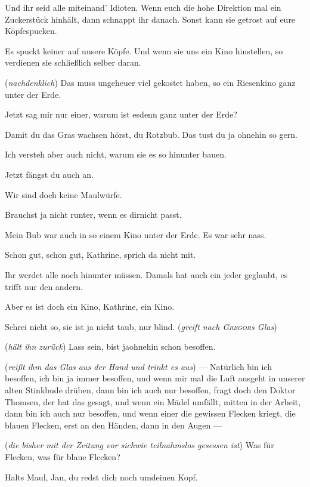 \documentclass[
	final,
	a4paper,
	ngerman,
	mpinclude = true, %
	twoside = true,
	open = right,
	cleardoublepage = plain,
	DIV = 13,
	BCOR = 1cm,
	titlepage = firstiscover,
	]{scrbook}
\newcommand{\direction}[1]{(\textit{#1})}
\newcommand{\thecharacter}[1]{\textup{\textsc{#1}}\xspace}
\newcommand{\theBarbara}{\thecharacter{Barbara}}
\newcommand{\theJosef}{\thecharacter{Josef}}
\newcommand{\theKathrine}{\thecharacter{Kathrine}}
\newcommand{\theGregor}{\thecharacter{Gregor}}
\newcommand{\theJan}{\thecharacter{Jan}}
\newcommand{\theAndreas}{\thecharacter{Andreas}}
\newcommand{\theLuise}{\thecharacter{Luise}}
\newcommand{\character}[1]{\item[#1]}
\newcommand{\Barbara}{\character{\theBarbara}}
\newcommand{\Josef}{\character{\theJosef}}
\newcommand{\Kathrine}{\character{\theKathrine}}
\newcommand{\Gregor}{\character{\theGregor}}
\newcommand{\Jan}{\character{\theJan}}
\newcommand{\Andreas}{\character{\theAndreas}}
\newcommand{\Luise}{\character{\theLuise}}
\begin{document}
\begin{play}
\Jan
Und ihr seid alle miteinand' Idioten. Wenn euch die hohe Direktion mal ein Zuckerstück hinhält, dann schnappt ihr danach. Sonst kann sie getrost auf eure Köpfespucken.

\Gregor
Es spuckt keiner auf unsere Köpfe. Und wenn sie uns ein Kino hinstellen, so verdienen sie schließlich selber daran.

\Luise
\direction{nachdenklich} Das muss ungeheuer viel gekostet haben, so ein Riesenkino ganz unter der Erde.

\Jan
Jetzt sag mir nur einer, warum ist esdenn ganz unter der Erde?

\Gregor
Damit du das Gras wachsen hörst, du Rotzbub. Das tust du ja ohnehin so gern.

\Andreas
Ich versteh aber auch nicht, warum sie es so hinunter bauen.

\Gregor
Jetzt fängst du auch an.

\Jan
Wir sind doch keine Maulwürfe.

\Gregor
Brauchst ja nicht runter, wenn es dirnicht passt.

\Kathrine
Mein Bub war auch in so einem Kino unter der Erde. Es war sehr nass.

\Josef
Schon gut, schon gut, Kathrine, sprich da nicht mit.

\Kathrine
Ihr werdet alle noch hinunter müssen. Damals hat auch ein jeder geglaubt, es trifft nur den andern.

\Josef
Aber es ist doch ein Kino, Kathrine, ein Kino.

\Jan
Schrei nicht so, sie ist ja nicht taub, nur blind. \direction{greift nach \theGregor{}s Glas}

\Gregor
\direction{hält ihn zurück} Lass sein, bist jaohnehin schon besoffen.

\Jan
\direction{reißt ihm das Glas aus der Hand und trinkt es aus} --- Natürlich bin ich besoffen, ich bin ja immer besoffen, und wenn mir mal die Luft ausgeht in unserer alten Stinkbude drüben, dann bin ich auch nur besoffen, fragt doch den Doktor Thomsen, der hat das gesagt, und wenn ein Mädel umfällt, mitten in der Arbeit, dann bin ich auch nur besoffen, und wenn einer die gewissen Flecken kriegt, die blauen Flecken, erst an den Händen, dann in den Augen ---

\Barbara
\direction{die bisher mit der Zeitung vor sichwie teilnahmslos gesessen ist} Was für Flecken, was für blaue Flecken?

\Luise
Halts Maul, Jan, du redst dich noch umdeinen Kopf.


\end{play}
\end{document}
